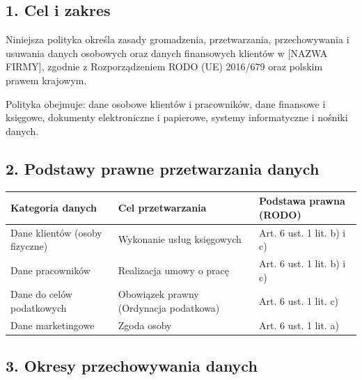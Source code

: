 \documentclass[12pt,a4paper]{article}
\begin{document}
\subsection{1. Cel i zakres}\label{cel-i-zakres}

Niniejsza polityka określa zasady gromadzenia, przetwarzania,
przechowywania i usuwania danych osobowych oraz danych finansowych
klientów w {[}NAZWA FIRMY{]}, zgodnie z Rozporządzeniem RODO (UE)
2016/679 oraz polskim prawem krajowym.

Polityka obejmuje: dane osobowe klientów i pracowników, dane finansowe i
księgowe, dokumenty elektroniczne i papierowe, systemy informatyczne i
nośniki danych.

\subsection{2. Podstawy prawne przetwarzania
danych}\label{podstawy-prawne-przetwarzania-danych}

\begin{longtable}[]{@{}>{\raggedright\arraybackslash}p{}>{\raggedright\arraybackslash}p{}>{\raggedright\arraybackslash}p{}@{}}
\toprule\noalign{}
Kategoria danych & Cel przetwarzania & Podstawa prawna (RODO) \\
\midrule\noalign{}
\endhead
\bottomrule\noalign{}
\endlastfoot
Dane klientów (osoby fizyczne) & Wykonanie usług księgowych & Art. 6
ust. 1 lit. b) i c) \\
Dane pracowników & Realizacja umowy o pracę & Art. 6 ust. 1 lit. b) i
c) \\
Dane do celów podatkowych & Obowiązek prawny (Ordynacja podatkowa) &
Art. 6 ust. 1 lit. c) \\
Dane marketingowe & Zgoda osoby & Art. 6 ust. 1 lit. a) \\
\end{longtable}

\subsection{3. Okresy przechowywania
danych}\label{okresy-przechowywania-danych}
\end{document}
